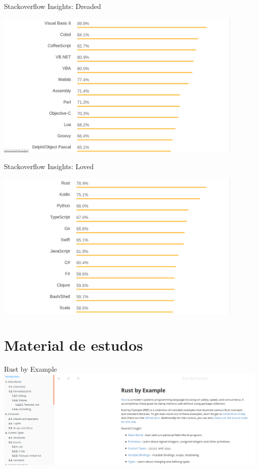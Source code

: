 \documentclass[aspectratio=169]{beamer}
\begin{document}
\begin{frame}{Stackoverflow Insights: Dreaded}
	\begin{center}
		\includegraphics[width=12.0cm]{imgs/stackoverflow-dreaded.png}	
	\end{center}
\end{frame}

\begin{frame}{Stackoverflow Insights: Loved}
	\begin{center}
		\includegraphics[width=12.0cm]{imgs/stackoverflow-loved.png}	
	\end{center}
\end{frame}

\section{Material de estudos}

\begin{frame}{Rust by Example}
	\includegraphics[width=15.0cm]{imgs/rust-by-example.png}	
\end{frame}
\end{document}
